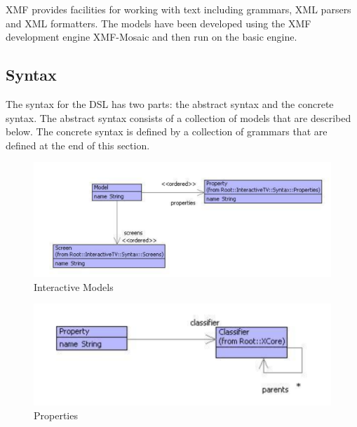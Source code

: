 XMF provides facilities for working with text including grammars,
XML parsers and XML formatters. The models have been developed using
the XMF development engine XMF-Mosaic and then run on the basic engine.


\subsection{Syntax}

The syntax for the DSL has two parts: the abstract syntax and the
concrete syntax. The abstract syntax consists of a collection of models
that are described below. The concrete syntax is defined by a collection
of grammars that are defined at the end of this section.

%
\begin{figure}
\begin{center}
\includegraphics[scale=0.6]{CaseStudy4/figures/Models.pdf}

\caption{Interactive Models\label{fig:Interactive-Models}}

\end{center}
\end{figure}


%
\begin{figure}
\begin{center}
\includegraphics[scale=0.75]{CaseStudy4/figures/Properties.pdf}

\caption{Properties\label{fig:Properties}}

\end{center}
\end{figure}


